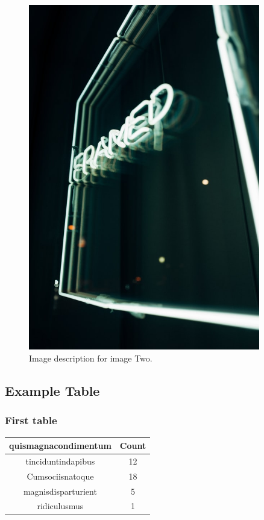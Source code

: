 \documentclass[
    a4paper,
    doc,
    11pt,
]{apa6}
\begin{document}
\begin{appendices}
\begin{figure}[h!]
    \end{figure}
    \newpage
    \begin{figure}[H]
        \centering
        \label{append:pic:two}
        \includegraphics[width=0.9\textwidth]{appendix/imageExample/pTwo.jpg}
        \caption{Image description for image Two.}
    \end{figure}
\endgroup

\newpage
\begingroup
\subsection{Example Table}
    \subsubsection{First table}
    \label{append:example_table}
    \begin{center}
        \begin{tabular}{ |c|c| }
            \hline
            quismagnacondimentum & Count \\
            \hline
            tinciduntindapibus & 12 \\ 
            Cumsociisnatoque & 18 \\ 
            magnisdisparturient & 5 \\ 
            ridiculusmus & 1 \\ 
            \hline
        \end{tabular}
    \end{center}
\endgroup


\end{appendices}
\end{document}
